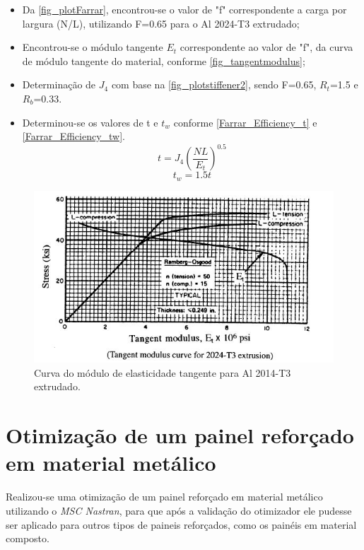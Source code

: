 {\begin{itemize}
\item Da \autoref{fig_plotFarrar}, encontrou-se o valor de "f" correspondente a carga por largura (N/L), utilizando F=0.65 para o Al 2024-T3 extrudado;
\item Encontrou-se o módulo tangente $E_t$ correspondente ao valor de "f", da curva de módulo tangente do material, conforme \autoref{fig_tangentmodulus};
\item Determinação de $J_4$ com base na \autoref{fig_plotstiffener2}, sendo F=0.65, $R_t$=1.5 e $R_b$=0.33.\
\item Determinou-se os valores de t e $t_w$ conforme \autoref{Farrar_Efficiency_t} e \autoref{Farrar_Efficiency_tw}.
\begin{equation} \label{Farrar_Efficiency_t}
t = J_4({\dfrac{NL}{E_t}})^{0.5}
\end{equation}
\begin{equation} \label{Farrar_Efficiency_tw}
t_w = 1.5t
\end{equation}

\end{itemize}

\begin{figure}[ht]
	\caption{\label{fig_tangentmodulus}Curva do módulo de elasticidade tangente para Al 2014-T3 extrudado.}
  \centering
  \includegraphics[scale=1.0]{figura/TangentModulus}
\end{figure}

\section{Otimização de um painel reforçado em material metálico}
Realizou-se uma otimização de um painel reforçado em material metálico utilizando o \emph{MSC Nastran}, para que após a validação do otimizador ele pudesse ser aplicado para outros tipos de paineis reforçados, como os painéis em material composto.

}
